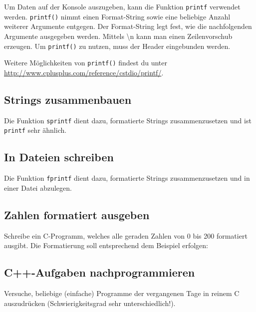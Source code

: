 Um Daten auf der Konsole auszugeben, kann die Funktion \lstinline{printf} verwendet werden.
\lstinline{printf()} nimmt einen Format-String sowie eine beliebige Anzahl weiterer Argumente entgegen.
Der Format-String legt fest, wie die nachfolgenden Argumente ausgegeben werden.
Mittels \textbackslash n kann man einen Zeilenvorschub erzeugen. Um \lstinline{printf()} zu nutzen, muss der Header  eingebunden werden.



Weitere Möglichkeiten von \lstinline{printf()} findest du unter \url{http://www.cplusplus.com/reference/cstdio/printf/}.


\subsection{Strings zusammenbauen}

Die Funktion \lstinline{sprintf} dient dazu, formatierte Strings zusammenzusetzen und ist \lstinline{printf} sehr ähnlich.


\subsection{In Dateien schreiben}

Die Funktion \lstinline{fprintf} dient dazu, formatierte Strings zusammenzusetzen und in einer Datei abzulegen.


\subsection{Zahlen formatiert ausgeben}
Schreibe ein C-Programm, welches alle geraden Zahlen von 0 bis 200 formatiert ausgibt.
Die Formatierung soll entsprechend dem Beispiel erfolgen:



\subsection{C++-Aufgaben nachprogrammieren}
Versuche, beliebige (einfache) Programme der vergangenen Tage in reinem C auszudrücken (Schwierigkeitsgrad sehr unterschiedlich!).
